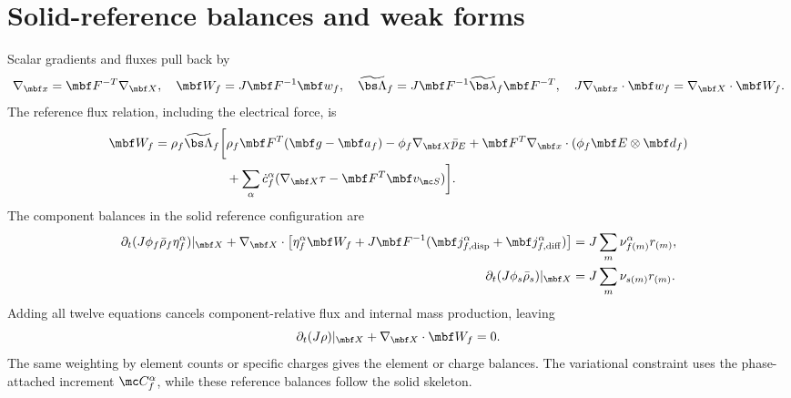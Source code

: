 \documentclass[11pt]{article}
\begin{document}
\section{Solid-reference balances and weak forms}
Scalar gradients and fluxes pull back by
\begin{equation}
 \nabla_{\mbf x}=\mbf F^{-T}\nabla_{\mbf X},\quad
 \mbf W_f=J\mbf F^{-1}\mbf w_f,\quad
 \widetilde{\bs\Lambda}_f=J\mbf F^{-1}\widetilde{\bs\lambda}_f\mbf F^{-T},
 \quad J\nabla_{\mbf x}\cdot\mbf w_f=\nabla_{\mbf X}\cdot\mbf W_f.
 \label{eq:piola_flux}
\end{equation}
The reference flux relation, including the electrical force, is
\begin{align}
 \mbf W_f=\rho_f\widetilde{\bs\Lambda}_f\bigg[&
 \rho_f\mbf F^T(\mbf g-\mbf a_f)-\phi_f\nabla_{\mbf X}\bar p_E
 +\mbf F^T\nabla_{\mbf x}\cdot(\phi_f\mbf E\otimes\mbf d_f)\notag\\
 &+\sum_\alpha\dot c_f^\alpha
 (\nabla_{\mbf X}\tau-\mbf F^T\mbf v_{\mc S})\bigg].
 \label{eq:reference_flux}
\end{align}
The component balances in the solid reference configuration are
\begin{align}
 \partial_t(J\phi_f\bar\rho_f\eta_f^\alpha)|_{\mbf X}
 +\nabla_{\mbf X}\cdot\left[
 \eta_f^\alpha\mbf W_f+J\mbf F^{-1}
 (\mbf j_{f,{\rm disp}}^\alpha+\mbf j_{f,{\rm diff}}^\alpha)\right]
 &=J\sum_m\nu_{f(m)}^\alpha r_{(m)},\label{eq:reference_fluid_mass}\\
 \partial_t(J\phi_s\bar\rho_s)|_{\mbf X}&=J\sum_m\nu_{s(m)}r_{(m)}.
 \label{eq:reference_solid_mass}
\end{align}
Adding all twelve equations cancels component-relative flux and internal mass production, leaving
\begin{equation}
 \partial_t(J\rho)|_{\mbf X}+\nabla_{\mbf X}\cdot\mbf W_f=0.
 \label{eq:reference_total_mass}
\end{equation}
The same weighting by element counts or specific charges gives the element or charge balances. The variational constraint uses the phase-attached increment \(\mc C_f^\alpha\), while these reference balances follow the solid skeleton.
\end{document}
